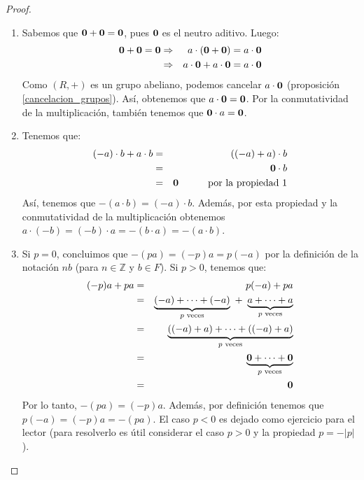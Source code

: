     \begin{proof} \hfill
        \begin{enumerate}
            \item 
            Sabemos que $\mathbf{0}+\mathbf{0} = \mathbf{0}$, pues $\mathbf{0}$ es el neutro aditivo. Luego:
            \begin{eqnarray*}
    \mathbf{0}+\mathbf{0} = \mathbf{0}		&\Rightarrow & a\cdot(\mathbf{0}+\mathbf{0}) = a\cdot \mathbf{0}\\
                &\Rightarrow &a\cdot \mathbf{0}+a\cdot \mathbf{0} = a\cdot \mathbf{0}
            \end{eqnarray*}
        Como $(R, +)$ es un grupo abeliano, podemos cancelar $a \cdot \mathbf{0}$ (proposición \ref{cancelacion_grupos}). Así, obtenemos que $a \cdot \mathbf{0} = \mathbf{0}$. Por la conmutatividad de la multiplicación, también tenemos que $\mathbf{0} \cdot a=\mathbf{0} $.
    
        \item Tenemos que:
            \begin{eqnarray*} (-a)\cdot b + a \cdot b & = & ((-a) +
            a) \cdot b\\ & = & \mathbf{0} \cdot b\\ 
            & = & \mathbf{0} \quad\quad\quad \text{por la propiedad 1}
            \end{eqnarray*}
    Así, tenemos que $-(a \cdot b) = (-a)\cdot b$. Además, por esta propiedad y la 
            conmutatividad de la multiplicación obtenemos $a\cdot (-b) = (-b) \cdot a = -(b\cdot a) = -(a\cdot b)$.
    
            \item Si $p = 0$, concluimos que $-(pa) = (-p)a = p(-a)$ por
            la definición de la notación $nb$ (para $n \in \mathbb{Z}$ y $b \in
            F$). Si $p > 0$, tenemos que:
    \begin{eqnarray*}
    (-p)a + pa & = & p(-a) + pa\\
    & = & \underbrace{(-a) +\cdots + (-a)}_\text{$p$ veces} \ + \ \underbrace{a +\cdots + a}_\text{$p$ veces}\\ 
    & = & \underbrace{((-a) + a) + \cdots + ((-a) + a)}_\text{$p$ veces}\\
    & = & \underbrace{\mathbf{0} + \cdots + \mathbf{0}}_\text{$p$ veces}\\
    & = & \mathbf{0}
    \end{eqnarray*}
    Por lo tanto, $-(pa) = (-p)a$. Además, por definición tenemos que $p(-a) = (-p)a = -(pa)$. El caso $p < 0$ es dejado como ejercicio para el lector (para resolverlo es útil considerar el caso $p > 0$ y la propiedad $p = -|p|$). 
    

\end{enumerate}
\end{proof}
